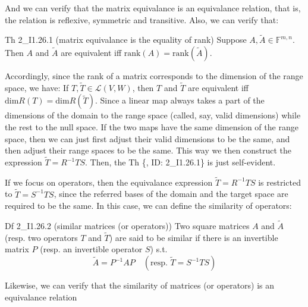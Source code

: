 \documentclass{article}
\begin{document}
And we can verify that \textcolor{Th}{the matrix equivalance is an equivalance relation, that is, the relation is reflexive, symmetric and transitive.} Also, we can verify that:

\begin{Th}{Th 2\_I1.26.1 (matrix equivalance is the equality of rank)}
    Suppose $A, \tilde{A}\in\mathbb{F}^{m,n}$. Then $A$ and $\tilde{A}$ are equivalent iff $\text{rank}(A) = \text{rank}(\tilde{A})$.
\end{Th}

Accordingly, since the rank of a matrix corresponds to the dimension of the range space, we have: \textcolor{Th}{If $T, \tilde{T}\in\mathcal{L}(V, W)$, then $T$ and $\tilde{T}$ are equivalent iff $\text{dim}R(T) = \text{dim}R(\tilde{T})$}. Since a linear map always takes a part of the dimensions of the domain to the range space (called, say, valid dimensions) while the rest to the null space. If the two maps have the same dimension of the range space, then we can just first adjust their valid dimensions to be the same, and then adjust their range spaces to be the same. This way we then construct the expression $\tilde{T} = R^{-1}TS$. Then, the Th \{, ID: 2\_I1.26.1\} is just self-evident. 

If we focus on operators, then the equivalance expression $\tilde{T} = R^{-1}TS$ is restricted to $\tilde{T} = S^{-1}TS$, since the referred bases of the domain and the target space are required to be the same. In this case, we can define the similarity of operators:

\begin{Df}{Df 2\_I1.26.2 (similar matrices (or operators))}
    Two square matrices $A$ and $\tilde{A}$ (resp. two operators $T$ and $\tilde{T}$) are said to be similar if there is an invertible matrix $P$ (resp. an invertible operator $S$) s.t.
    $$ \tilde{A} = P^{-1}AP \quad(\text{resp. } \tilde{T} = S^{-1}TS) $$
\end{Df}

Likewise, we can verify that \textcolor{Th}{the similarity of matrices (or operators) is an equivalance relation}
\end{document}
